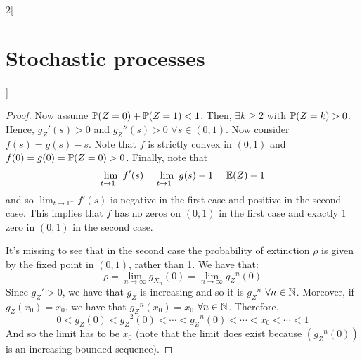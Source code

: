 \documentclass[../../../main_math.tex]{subfiles}
\begin{document}
\begin{multicols}{2}[\section{Stochastic processes}]
\begin{proof}
    Now assume $\mathbb{P}(Z=0)+\mathbb{P}(Z=1)<1$. Then, $\exists k\geq 2$ with $\mathbb{P}(Z=k)>0$. Hence, ${g_Z}'(s)>0$ and ${g_Z}''(s)>0$ $\forall s\in (0,1)$. Now consider $f(s)=g(s)-s$. Note that $f$ is strictly convex in $(0,1)$ and $f(0)=g(0)=\mathbb{P}(Z=0)>0$. Finally, note that $$\lim_{t\to 1^-} f'(s)=\lim_{t\to 1^-}g(s)-1=\mathbb{E}(Z)-1$$
    and so $\displaystyle\lim_{t\to 1^-} f'(s)$ is negative in the first case and positive in the second case. This implies that $f$ has no zeros on $(0,1)$ in the first case and exactly 1 zero in $(0,1)$ in the second case.

    It's missing to see that in the second case the probability of extinction $\rho$ is given by the fixed point in $(0,1)$, rather than 1. We have that:
    $$\rho=\lim_{n\to\infty}g_{X_n}(0)=\lim_{n\to\infty}{g_Z}^n(0)$$
    Since ${g_Z}'>0$, we have that ${g_Z}$ is increasing and so it is ${g_Z}^n$ $\forall n\in\mathbb{N}$. Moreover, if ${g_Z}(x_0)=x_0$, we have that ${g_Z}^n(x_0)=x_0$ $\forall n\in\mathbb{N}$. Therefore, $$0<{g_Z}(0)<{g_Z}^2(0)<\cdots<{g_Z}^n(0)<\cdots <x_0<\cdots <1$$
    And so the limit has to be $x_0$ (note that the limit does exist because $({g_Z}^n(0))$ is an increasing bounded sequence).
  \end{proof}

\end{multicols}
\end{document}
